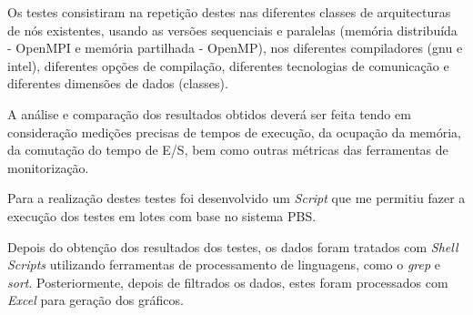 \documentclass[conference,compsoc]{IEEEtran}
\begin{document}
Os testes consistiram na repetição destes nas diferentes classes de arquitecturas de nós existentes, usando as versões sequenciais e paralelas (memória distribuída - OpenMPI e memória partilhada - OpenMP), nos diferentes compiladores (gnu e intel), diferentes opções de compilação, diferentes tecnologias de comunicação e diferentes dimensões de dados (classes).


A análise e comparação dos resultados obtidos deverá ser feita tendo em consideração medições precisas de tempos de execução, da ocupação da memória, da comutação do tempo de E/S, bem como outras métricas das ferramentas de monitorização.


Para a realização destes testes foi desenvolvido um \textit{Script} que me permitiu fazer a execução dos testes em lotes com base no sistema PBS.

Depois do obtenção dos resultados dos testes, os dados foram tratados com \textit{Shell Scripts} utilizando ferramentas de processamento de linguagens, como o \textit{grep} e \textit{sort}. Posteriormente, depois de filtrados os dados, estes foram processados com \textit{Excel} para geração dos gráficos.
\end{document}
